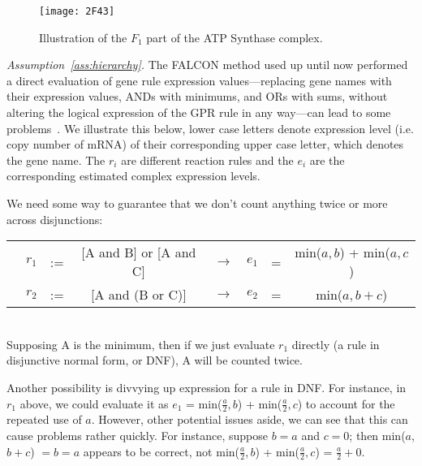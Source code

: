 \begin{figure}[H]
\caption{Illustration of the $F_1$ part of the ATP Synthase complex.}
\label{fig:2F43}
\centering
\texttt{[image: 2F43]}
\end{figure}

\emph{Assumption~\ref{ass:hierarchy}.}
The FALCON method used up until now performed a direct evaluation of
gene rule expression values---replacing gene names with their
expression values, ANDs with minimums, and ORs with sums, without
altering the logical expression of the GPR rule in any way---can lead
to some problems~\cite{Lee2012}. We illustrate this below, lower case
letters denote expression level (i.e. copy number of mRNA) of their
corresponding upper case letter, which denotes the gene name. The
$r_i$ are different reaction rules and the $e_i$ are the corresponding
estimated complex expression levels.

We need some way to guarantee that we don’t count anything twice or
more across disjunctions: \\
\begin{tabular}{cccccccc}
& $r_1$ & := & [A and B] or [A and C] & $\rightarrow$ & $e_1$  &=& min($a,b$) + min($a,c$) \\ 
& $r_2$ & := & [A and (B or C)]       & $\rightarrow$ & $e_2$  &=&  min($a, b + c$) 
\end{tabular} \\
Supposing A is the minimum, then if we just evaluate $r_1$ directly (a
rule in disjunctive normal form, or DNF), A will be counted twice.

Another possibility is divvying up expression for a rule in DNF. For
instance, in $r_1$ above, we could evaluate it as $e_1$ =
min($\frac{a}{2},b$) + min($\frac{a}{2},c$) to account for the
repeated use of $a$. However, other potential issues aside, we can see
that this can cause problems rather quickly. For instance, suppose $b
= a$ and $c = 0$; then min($a$,$b+c$) $=b=a$ appears to be correct,
not min($\frac{a}{2},b$) + min($\frac{a}{2},c$) = $\frac{a}{2} + 0$.

